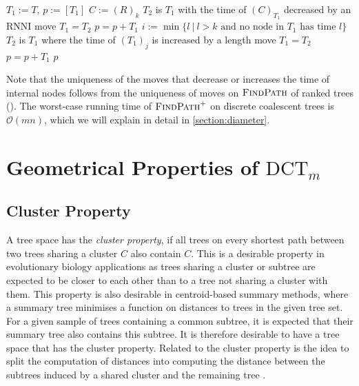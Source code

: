 \documentclass[11pt]{amsart}
\newcommand{\rnni}{\mathrm{RNNI}}
\newcommand{\findpath}{\textsc{FindPath}}
\newcommand{\ntime}{\mathrm{time}}
\newcommand{\dct}{\mathrm{DCT}}
\renewcommand{\O}{\mathcal O}
\newcommand{\summary}[1]{} %
\begin{document}
\begin{algorithm}[h]
	\caption{$\findpath^+$($T,R$)}
	\begin{algorithmic}[1]
		\label{alg:fp_dtt}
		\STATE $T_1 := T$, $p := [T_1]$
		 \label{alg:fp_dtt:for}
			\STATE $C:=(R)_k$
			\WHILE {$\ntime((C)_{T_1})>k$} \label{alg:fp_dtt:while}
					\STATE $T_2$ is $T_1$ with the time of $(C)_{T_1}$ decreased by an $\rnni$ move
				\STATE $T_1 = T_2$
				\STATE $p = p+T_1$
			\ENDWHILE
				\STATE $i := \min\{l \ |\  l>k \text{ and no node in } T_1 \text{ has time }l\}$ \label{line:min_free_time}
				 \label{alg:fp_dtt:nested_for}
					\label{line:length_move}
					\STATE $T_2$ is $T_1$ where the time of $(T_1)_j$ is increased by a length move
					\STATE $T_1 = T_2$
					\STATE $p = p+T_1$
				\ENDFOR
			\ENDIF
		\ENDFOR
		\RETURN $p$
	\end{algorithmic}
\end{algorithm}

Note that the uniqueness of the moves that decrease or increases the time of internal nodes follows from the uniqueness of moves on $\findpath$ of ranked trees (\autocite[Proposition 1]{Collienne2021}).
The worst-case running time of $\findpath^+$ on discrete coalescent trees is $\O(mn)$, which we will explain in detail in \autoref{section:diameter}.

\section{Geometrical Properties of $\dct_m$}
\label{section:geometry}

\subsection{Cluster Property}
\label{section:cluster_property}
\summary{Definition of Cluster Property and why it is relevant (a bit of bio).}
A tree space has the \emph{cluster property}, if all trees on every shortest path between two trees sharing a cluster $C$ also contain $C$.
This is a desirable property in evolutionary biology applications as trees sharing a cluster or subtree are expected to be closer to each other than to a tree not sharing a cluster with them.
This property is also desirable in centroid-based summary methods, where a summary tree minimises a function on distances to trees in the given tree set.
For a given sample of trees containing a common subtree, it is expected that their summary tree also contains this subtree.
It is therefore desirable to have a tree space that has the cluster property.
Related to the cluster property is the idea to split the computation of distances into computing the distance between the subtrees induced by a shared cluster and the remaining tree \autocite{Bordewich2005-nx}.
\end{document}
